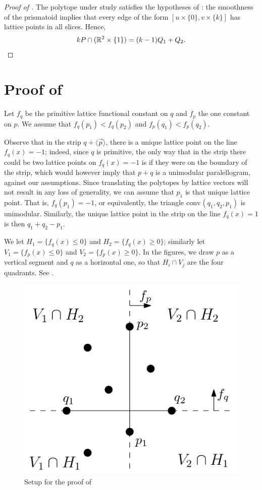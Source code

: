 \documentclass{amsart}
\theoremstyle{plain}
\theoremstyle{definition}
\newcommand{\R}{ \ensuremath{\mathbb{R}}}
\renewcommand{\vec}[1]{\overrightarrow#1}
\newcommand{\vecline}[1]{\langle \vec #1 \rangle}
\newcommand{\conv}{\ensuremath{\mathrm{conv}}\hspace{1pt}}
\begin{document}
\begin{proof}[Proof of ]
The polytope under study satisfies the hypotheses of : %
the smoothness of the prismatoid implies that every edge of the form $[u\times \{0\}, v\times \{k\}]$ has lattice points in all slices. 
Hence,
\[
kP \cap(\R^2\times\{1\}) = (k-1)Q_1 + Q_2.
\qedhere
\] 
\end{proof}




\section{Proof of }
\label{sec:the_lemma}
Let $f_q$ be the primitive lattice functional constant on $q$ and $f_p$ the one constant on $p$. We assume that $f_q(p_1) < f_q(p_2)$ and $f_p(q_1) < f_p(q_2)$.

Observe that in the strip $q +\vecline p$, there is a unique lattice point on the line $f_q(x)=-1$;  indeed, since $q$ is primitive, the only way that in the strip there could be two lattice points on $f_q(x)=-1$ is if they were on the boundary of the strip, which would however imply that $p+q$ is a unimodular paralellogram, against our assumptions.
Since translating the polytopes by lattice vectors will not result in any loss of generality, we can assume that $p_1$ is that unique lattice point. That is, $f_q(p_1)=-1$, or equivalently, the triangle $\conv(q_1, q_2, p_1)$ is unimodular. Similarly, the unique lattice point in the strip on the line $f_q(x)=1$ is then $q_1+q_2 -p_1$.

We let $H_1=\{f_q(x) \leq 0\}$ and $H_2=\{f_q(x) \geq 0\}$; similarly let $V_1=\{f_p(x) \leq 0\}$ and $V_2=\{f_p(x) \geq 0\}$. 
In the figures, we draw $p$ as a vertical segment and $q$ as a horizontal one, so that $H_i \cap V_j$ are the four quadrants. 
See .
%
\begin{figure}[htb]
\includegraphics[scale=.3]{setup.png}
\caption{Setup for the proof of }
\label{fig:setup}
\end{figure}
\end{document}
